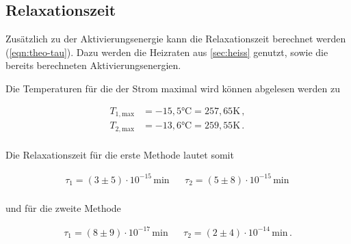 \subsection{Relaxationszeit}
Zusätzlich zu der Aktivierungsenergie kann die Relaxationszeit berechnet werden (\ref{eqn:theo-tau}). Dazu werden die Heizraten aus \autoref{sec:heiss} genutzt, sowie die 
bereits berechneten Aktivierungsenergien.

\noindent
Die Temperaturen für die der Strom maximal wird können abgelesen werden zu 

\begin{align*}
  T_{1,\text{max}} &= -15,5 \si{\celsius} =257,65 \si{\kelvin} \, , \\
  T_{2,\text{max}} &= -13,6 \si{\celsius} =259,55 \si{\kelvin} \, .\\
\end{align*}

\noindent
Die Relaxationszeit für die erste Methode lautet somit

\begin{align*}
  \tau_{1} =  (3 \pm 5)\cdot 10^{-15}\,\si{\minute} &&  \tau_{2} = (5 \pm 8)\cdot 10^{-15}\,\si{\minute}\,  \\ 
\end{align*}

und für die zweite Methode

\begin{align*}
  \tau_{1} =  ( 8\pm 9)\cdot 10^{-17}\,\si{\minute} &&  \tau_{2} = (2\pm 4)\cdot 10^{-14}\,\si{\minute}\, . \\ 
\end{align*}


